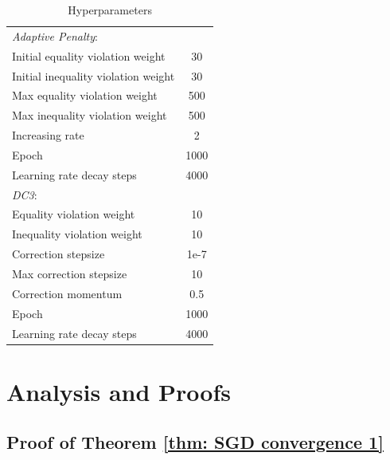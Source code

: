 \documentclass{article}
\newcommand{\e}[1]{e{#1}}
\begin{document}
\begin{table}[ht]
\begin{tabular}{l|c}
\midrule
\hspace{-8pt} \textit{Adaptive Penalty}: & \\
Initial equality violation weight & 30  \\
Initial inequality violation weight & 30 \\
Max equality violation weight & 500  \\
Max inequality violation weight & 500 \\
Increasing rate & 2 \\
Epoch & 1000 \\
Learning rate decay steps & 4000\\
 
\midrule
\hspace{-8pt} \textit{DC3}: & \\
Equality violation weight & 10  \\
Inequality violation weight & 10 \\
Correction stepsize & 1\e{-7} \\
Max correction stepsize & 10 \\
Correction momentum & 0.5 \\
Epoch & 1000 \\
Learning rate decay steps & 4000

\end{tabular}
\caption{Hyperparameters}
\label{tab: hyperparameters}
\end{table}




\clearpage
\section{Analysis and Proofs} \label{appendix: proofs}

\subsection{Proof of Theorem \ref{thm: SGD convergence 1}}
\thmSgdConvergence*
\end{document}

